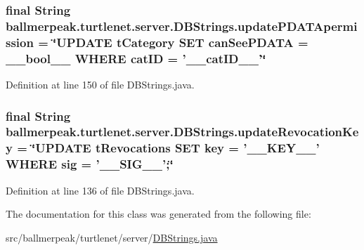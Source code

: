 \hypertarget{classballmerpeak_1_1turtlenet_1_1server_1_1DBStrings_a1464c2aac4cc5e8112ece2e1840e1976}{
\subsubsection[{update\-P\-D\-A\-T\-Apermission}]{\setlength{\rightskip}{0pt plus 5cm}final String ballmerpeak.\-turtlenet.\-server.\-D\-B\-Strings.\-update\-P\-D\-A\-T\-Apermission = \char`\"{}U\-P\-D\-A\-T\-E t\-Category S\-E\-T {\bf can\-See\-P\-D\-A\-T\-A} = \-\_\-\-\_\-bool\-\_\-\-\_\- W\-H\-E\-R\-E cat\-I\-D = '\-\_\-\-\_\-cat\-I\-D\-\_\-\-\_\-'\char`\"{}\hspace{0.3cm}{\ttfamily [static]}}}\label{classballmerpeak_1_1turtlenet_1_1server_1_1DBStrings_a1464c2aac4cc5e8112ece2e1840e1976}


Definition at line 150 of file D\-B\-Strings.\-java.

\hypertarget{classballmerpeak_1_1turtlenet_1_1server_1_1DBStrings_a39d82ab9d47622f3d106772a81171a1d}{
\subsubsection[{update\-Revocation\-Key}]{\setlength{\rightskip}{0pt plus 5cm}final String ballmerpeak.\-turtlenet.\-server.\-D\-B\-Strings.\-update\-Revocation\-Key = \char`\"{}U\-P\-D\-A\-T\-E t\-Revocations S\-E\-T key = '\-\_\-\-\_\-\-K\-E\-Y\-\_\-\-\_\-' W\-H\-E\-R\-E sig = '\-\_\-\-\_\-\-S\-I\-G\-\_\-\-\_\-';\char`\"{}\hspace{0.3cm}{\ttfamily [static]}}}\label{classballmerpeak_1_1turtlenet_1_1server_1_1DBStrings_a39d82ab9d47622f3d106772a81171a1d}


Definition at line 136 of file D\-B\-Strings.\-java.



The documentation for this class was generated from the following file\-:\begin{DoxyCompactItemize}
\item 
src/ballmerpeak/turtlenet/server/\hyperlink{DBStrings_8java}{D\-B\-Strings.\-java}\end{DoxyCompactItemize}
